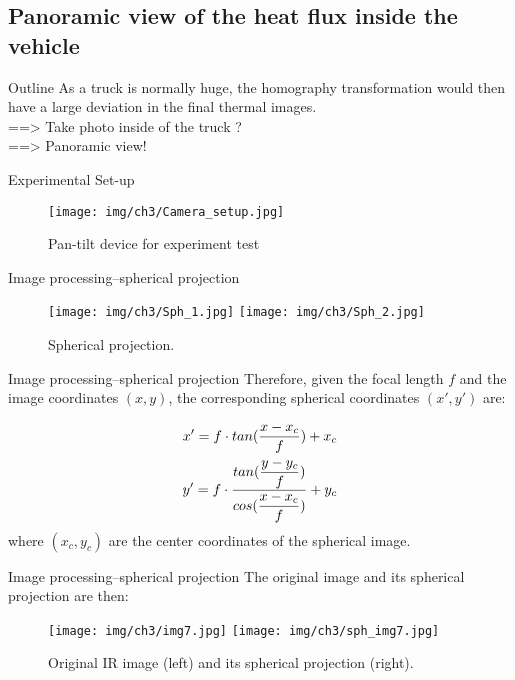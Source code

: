 \subsection{Panoramic view of the heat flux inside the vehicle}

\begin{frame}{Outline}
 As a truck is normally huge, the homography transformation would then have a large deviation in the final thermal images.\\
 \pause
 ==> Take photo inside of the truck ?\\
 \pause
 ==> \alert{Panoramic view!}
\end{frame}


\begin{frame}{Experimental Set-up}
    \begin{figure}[ht]
        \centering
        \texttt{[image: img/ch3/Camera\_setup.jpg]}
        \caption{Pan-tilt device for experiment test}
    \end{figure}
\end{frame}


\begin{frame}{Image processing--\small{spherical projection}}
    \begin{figure}
        \hspace*{-15pt}
        \texttt{[image: img/ch3/Sph\_1.jpg]}
        \texttt{[image: img/ch3/Sph\_2.jpg]}
        \caption{Spherical projection.}
        \label{Sph_pro}
    \end{figure}
\end{frame}

\begin{frame}{Image processing--\small{spherical projection}}
Therefore, given the focal length $ f $ and the image coordinates $ (x, y) $, the corresponding spherical coordinates $ (x', y') $ are:

    \begin{align*}
        x'={} f \cdot tan(\dfrac{x-x_c}{f})+x_c \notag \\
        y'=f \cdot \frac{tan(\dfrac{y-y_c}{f})}{cos(\dfrac{x-x_c}{f})} +y_c
    \end{align*}
where $ (x_c,y_c) $ are the center coordinates of the spherical image.

\end{frame}


\begin{frame}{Image processing--\small{spherical projection}}
The original image and its spherical projection are then:
    \begin{figure}
        \hspace*{-15pt}
        \texttt{[image: img/ch3/img7.jpg]}
        \texttt{[image: img/ch3/sph\_img7.jpg]}
        \caption{Original IR image (left) and its spherical projection (right).}
        \label{Orig_sph}
    \end{figure}
\end{frame}


